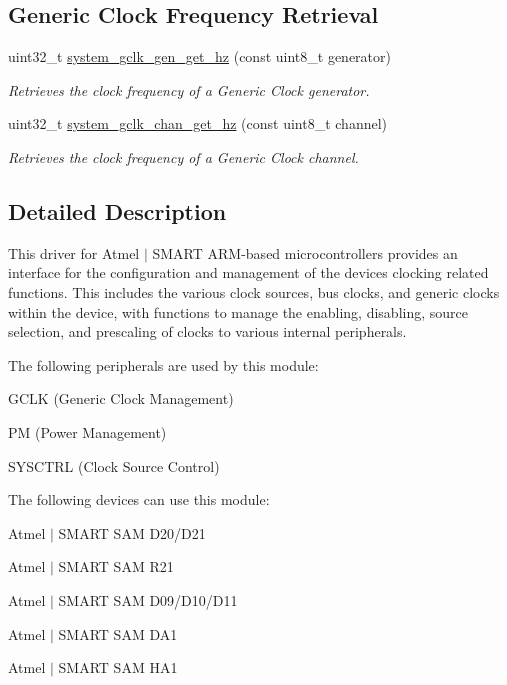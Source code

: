 \subsection*{Generic Clock Frequency Retrieval}
\begin{DoxyCompactItemize}
\item 
uint32\+\_\+t \mbox{\hyperlink{group__asfdoc__sam0__system__clock__group_gaf5cd7b482ee14413084669c32eef84cb}{system\+\_\+gclk\+\_\+gen\+\_\+get\+\_\+hz}} (const uint8\+\_\+t generator)
\begin{DoxyCompactList}\small\item\em Retrieves the clock frequency of a Generic Clock generator. \end{DoxyCompactList}\item 
uint32\+\_\+t \mbox{\hyperlink{group__asfdoc__sam0__system__clock__group_ga6683b93425b58d6c94b850419dd4c860}{system\+\_\+gclk\+\_\+chan\+\_\+get\+\_\+hz}} (const uint8\+\_\+t channel)
\begin{DoxyCompactList}\small\item\em Retrieves the clock frequency of a Generic Clock channel. \end{DoxyCompactList}\end{DoxyCompactItemize}


\subsection{Detailed Description}
This driver for Atmel\textregistered{} $\vert$ S\+M\+A\+RT A\+RM\textregistered{}-\/based microcontrollers provides an interface for the configuration and management of the device\textquotesingle{}s clocking related functions. This includes the various clock sources, bus clocks, and generic clocks within the device, with functions to manage the enabling, disabling, source selection, and prescaling of clocks to various internal peripherals.

The following peripherals are used by this module\+:


\begin{DoxyItemize}
\item G\+C\+LK (Generic Clock Management)
\item PM (Power Management)
\item S\+Y\+S\+C\+T\+RL (Clock Source Control)
\end{DoxyItemize}

The following devices can use this module\+:
\begin{DoxyItemize}
\item Atmel $\vert$ S\+M\+A\+RT S\+AM D20/\+D21
\item Atmel $\vert$ S\+M\+A\+RT S\+AM R21
\item Atmel $\vert$ S\+M\+A\+RT S\+AM D09/\+D10/\+D11
\item Atmel $\vert$ S\+M\+A\+RT S\+AM D\+A1
\item Atmel $\vert$ S\+M\+A\+RT S\+AM H\+A1
\end{DoxyItemize}

